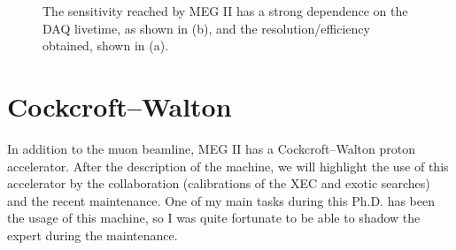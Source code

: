 \begin{refsection}
    \begin{figure}   
        \centering
        \hfill
        \caption{The sensitivity reached by MEG II has a strong dependence on the DAQ livetime, as shown in (b), and the resolution/efficiency obtained, shown in (a).}
        \label{fig:MEG:sensitivity}
    \end{figure}

\section{Cockcroft–Walton}
    \label{sec:cw:calib}
    In addition to the muon beamline, MEG II has a Cockcroft–Walton proton accelerator. 
    After the description of the machine, we will highlight the use of this accelerator by the collaboration (calibrations of the XEC and exotic searches) and the recent maintenance.
    One of my main tasks during this Ph.D. has been the usage of this machine, so I was quite fortunate to be able to shadow the expert during the maintenance.


\end{refsection}

